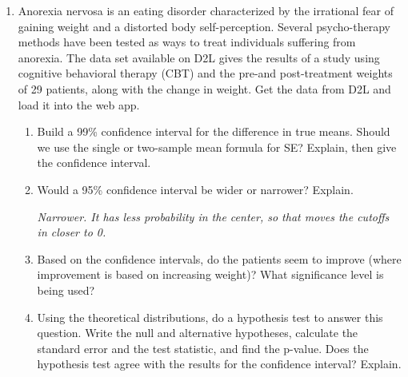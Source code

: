 \begin{enumerate}
       \item 
         Anorexia nervosa is an eating disorder characterized by
         the irrational fear of gaining weight and a distorted body
         self-perception.  Several 
         psycho-therapy methods have been tested as  ways to treat
         individuals suffering from anorexia.  The data set available
         on D2L gives the results of a study using cognitive
         behavioral therapy (CBT) and the pre-and post-treatment
         weights of 29 patients, along with the change in weight. 
         Get the data from D2L and load it into the web app.
         \begin{enumerate}
         \item\label{int1}  Build a 99\% confidence interval for the
           difference in true means.   
            Should we use the single or two-sample mean
           formula for SE?  Explain, then give the confidence
           interval. 
\begin{students}
          \vspace{2cm}
\end{students}
\begin{key}
 {\it  }      
\end{key}


         \item Would a 95\% confidence interval be wider or narrower?
           Explain. 
\begin{students}
          \vspace{2cm}
\end{students}
\begin{key}
 {\it Narrower. It has less probability in the center, so that moves
   the cutoffs in closer to 0. }      
\end{key}

         \item  Based on the confidence intervals, do the patients
           seem to improve (where improvement is based on increasing
           weight)?  What significance level is being used?
\begin{students}
          \vspace{2cm}
\end{students}
\begin{key}
 {\it  }      
\end{key}
           

         \item  Using the theoretical distributions, do a hypothesis
           test to answer this question.  Write the null and
           alternative hypotheses, calculate the standard error and
           the test statistic, and find the p-value.  Does the
           hypothesis test agree with the results for the confidence
           interval?  Explain. 
\begin{students}
          \vspace{4cm}
\end{students}
\begin{key}
 {\it  }      
\end{key}


\end{enumerate}
\end{enumerate}
